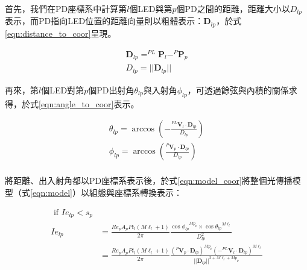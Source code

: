\begin{description}
        \qquad
        首先，我們在PD座標系中計算第$l$個LED與第$p$個PD之間的距離，距離大小以$D_{lp}$表示，而PD指向LED位置的距離向量則以粗體表示：$\boldsymbol{D}_{lp}$，於式\ref{eqn:distance_to_coor}呈現。
        
        \begin{equation}
            \label{eqn:distance_to_coor}
            \begin{aligned}
            \boldsymbol{D}_{lp} = ^{PL}\boldsymbol{P}_l- ^{P}\boldsymbol{P}_p \\
            D_{lp} = ||\boldsymbol{D}_{lp}||
            \end{aligned}
        \end{equation}

        \qquad
        再來，第$l$個LED對第$p$個PD出射角$\theta_{lp}$與入射角$\phi_{lp}$，可透過餘弦與內積的關係求得，於式\ref{eqn:angle_to_coor}表示。

        \begin{equation}
            \label{eqn:angle_to_coor}
            \begin{aligned}
            \theta_{lp} = \arccos(-\frac{^{PL}\boldsymbol{V}_l \cdot {\boldsymbol{D}_{lp}}}{D_{lp}})\\
            \phi_{lp} = \arccos(\frac{^{P}\boldsymbol{V}_p \cdot {\boldsymbol{D}_{lp}}}{D_{lp}})\\
            \end{aligned}
        \end{equation}

        \qquad
        將距離、出入射角都以PD座標系表示後，於式\ref{eqn:model_coor}將整個光傳播模型（式\ref{eqn:model}）以組態與座標系轉換表示：

        \begin{equation}
            \label{eqn:model_coor}
            \begin{aligned}
                \text { if } Ie_{lp}<s_p \\
                Ie_{lp} &= \frac{Re_pA_pPt_l(M\ell_{l}+1)}{2 \pi} \frac{ {\cos\phi_{lp}}^{Mp_{p}} \times{\cos \theta_{lp}}^{M\ell_{l}}}{D^2_{lp}}\\
                    & = \frac{Re_pA_pPt_l(M\ell_{l}+1)}{2 \pi} \frac{ {{(^{P}\boldsymbol{V}_p \cdot {\boldsymbol{D}_{lp}})}}^{Mp_{p}} {(-^{PL}\boldsymbol{V}_l \cdot {\boldsymbol{D}_{lp}})}^{M\ell_{l}}}  {{||{\boldsymbol{D}_{lp}}||}^{2+M\ell_l+Mp_p}}
            \end{aligned}
        \end{equation}


\end{description}
